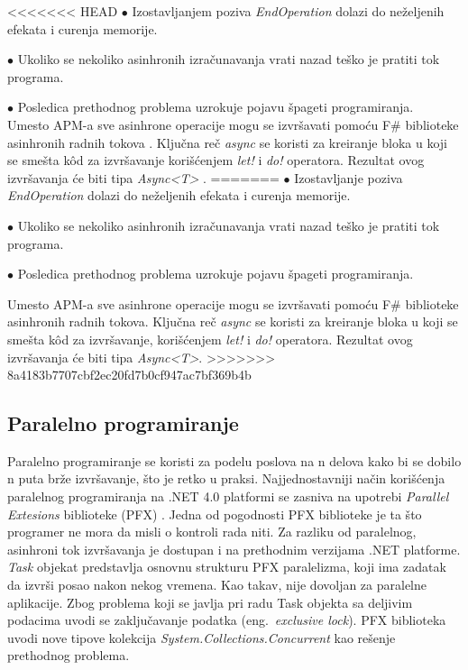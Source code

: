 \documentclass[a4paper]{article}
\begin{document}
<<<<<<< HEAD
$\bullet$ Izostavljanjem poziva {\em EndOperation} dolazi do neželjenih efekata i curenja memorije. 
 
$\bullet$ Ukoliko se nekoliko asinhronih izračunavanja vrati nazad teško je pratiti tok programa.
	
$\bullet$ Posledica prethodnog problema uzrokuje pojavu špageti programiranja. \\

Umesto APM-a sve asinhrone operacije mogu se izvršavati pomoću F\# biblioteke asinhronih radnih tokova \cite{progFs}. Ključna reč {\em async} se koristi za kreiranje bloka u koji se smešta kôd za izvršavanje korišćenjem {\em let!} i {\em do!} operatora. Rezultat ovog izvršavanja će biti tipa {\em Async<T>} \cite{progFs}.
=======
	$\bullet$ Izostavljanje poziva {\em EndOperation} dolazi do neželjenih efekata i curenja memorije. 
 
	$\bullet$ Ukoliko se nekoliko asinhronih izračunavanja vrati nazad teško je pratiti tok programa.
	
	$\bullet$ Posledica prethodnog problema uzrokuje pojavu špageti programiranja.

Umesto APM-a sve asinhrone operacije mogu se izvršavati pomoću F\# biblioteke asinhronih radnih tokova\cite{progFs}. Ključna reč {\em async} se koristi za kreiranje bloka u koji se smešta kôd za izvršavanje, korišćenjem {\em let!} i {\em do!} operatora. Rezultat ovog izvršavanja će biti tipa {\em Async<T>}\cite{progFs}.
>>>>>>> 8a4183b7707cbf2ec20fd7b0cf947ac7bf369b4b

\subsection{Paralelno programiranje}

Paralelno programiranje se koristi za podelu poslova na n delova kako bi se dobilo n puta brže izvršavanje, što je retko u praksi. Najjednostavniji način korišćenja paralelnog programiranja na .NET 4.0 platformi se zasniva na upotrebi {\em Parallel Extesions} biblioteke (PFX) \cite{progFs}. Jedna od pogodnosti PFX biblioteke je ta što programer ne mora da misli o kontroli rada niti. Za razliku od paralelnog, asinhroni tok izvršavanja je dostupan i na prethodnim verzijama .NET platforme. {\em Task} objekat predstavlja osnovnu strukturu PFX paralelizma, koji ima zadatak da izvrši posao nakon nekog vremena. Kao takav, nije dovoljan za paralelne aplikacije. Zbog problema koji se javlja pri radu Task objekta sa deljivim podacima uvodi se zaključavanje podatka (eng.~{\em exclusive lock}). PFX biblioteka uvodi nove tipove kolekcija {\em System.Collections.Concurrent} \cite{sysCC} kao rešenje prethodnog problema.  
\end{document}
